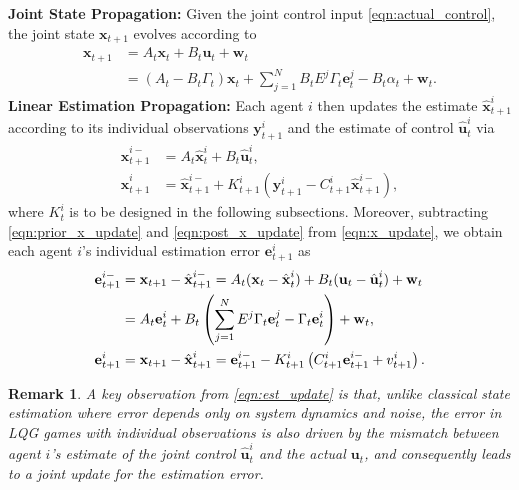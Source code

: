 \documentclass[letterpaper, 10 pt, conference]{ieeeconf}  %
\newtheorem{remark}{Remark}
\begin{document}
\textbf{Joint State Propagation:} Given the joint control input \eqref{eqn:actual_control},  the joint state $\textbf{x}_{t+1}$ evolves according to
\begin{equation}
    \begin{aligned}
        \textbf{x}_{t+1}&=A_t\textbf{x}_t+B_t\textbf{u}_t+\textbf{w}_t\\
        &=(A_t-B_t\Gamma_t)\textbf{x}_t+\sum_{j=1}^NB_tE^j\Gamma_t\textbf{e}_t^j-B_t\alpha_t+\textbf{w}_t.
    \end{aligned}
    \label{eqn:x_update}
\end{equation}
\textbf{Linear Estimation Propagation:} 
Each agent $i$ then updates the estimate $\hat{\textbf{x}}_{t+1}^i$ according to its individual observations $\textbf{y}_{t+1}^i$ and the estimate of control $\hat{\textbf{u}}_t^i$ via
\begin{subequations}
    \begin{align}
        \hat{\textbf{x}}_{t+1}^{i-}&=A_t\hat{\textbf{x}}_t^i+B_t\hat{\textbf{u}}_t^i,\label{eqn:prior_x_update}\\
        \hat{\textbf{x}}_{t+1}^i&=\hat{\textbf{x}}_{t+1}^{i-}+K_{t+1}^i\left(\textbf{y}_{t+1}^i-C_{t+1}^i\hat{\textbf{x}}_{t+1}^{i-}\right),\label{eqn:post_x_update}
    \end{align}
    \label{eqn:est_x_update}%
\end{subequations}
where $K_t^i$ is to be designed in the following subsections. Moreover, subtracting \eqref{eqn:prior_x_update} and \eqref{eqn:post_x_update} from \eqref{eqn:x_update}, we obtain each agent $i$'s individual estimation error $\textbf{e}_{t+1}^i$ as
\begin{subequations}
    \begin{align}
        \textbf{e}_{t+1}^{i-}&=\textbf{x}_{t+1}-\hat{\textbf{x}}_{t+1}^{i-}=A_t(\textbf{x}_t-\hat{\textbf{x}}_t^i)+B_t(\textbf{u}_t-\hat{\textbf{u}}_t^i)+\textbf{w}_t\notag\\
        &=A_t\textbf{e}_t^i+B_t\left(\sum_{j=1}^NE^j\Gamma_t\textbf{e}_t^j-\Gamma_t\textbf{e}_t^i\right)+\textbf{w}_t,\label{eqn:ind_err_prior_update}\\
        \textbf{e}_{t+1}^i&=\textbf{x}_{t+1}-\hat{\textbf{x}}_{t+1}^i=\textbf{e}_{t+1}^{i-}-K_{t+1}^i\left(C_{t+1}^i\textbf{e}_{t+1}^{i-}+v_{t+1}^i\right).\label{eqn:ind_err_post_update}
    \end{align}
    \label{eqn:est_update}%
\end{subequations}
\vspace{-4ex}
\begin{remark}
A key observation from \eqref{eqn:est_update} is that, unlike classical state estimation where error depends only on system dynamics and noise, the error in LQG games with individual observations is also driven by the mismatch between agent $i$'s estimate of the joint control $\hat{\textbf{u}}_t^i$ and the actual $\textbf{u}_t$, and consequently leads to a joint update for the estimation error.
\end{remark}
\end{document}
